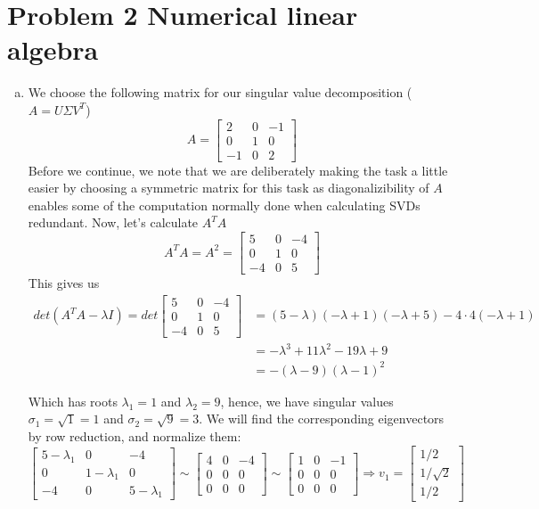 \section{Problem 2 Numerical linear algebra}
\begin{enumerate}[a)]
  \item
We choose the following matrix for our singular value decomposition ($A=U\Sigma V^T$)
\begin{equation}
  A =
  \begin{bmatrix}
    2 & 0 & -1 \\
    0 & 1 & 0 \\
    -1 & 0 & 2
  \end{bmatrix}
\end{equation}
Before we continue, we note that we are deliberately making the task a little easier by choosing a symmetric matrix for this task as diagonalizibility of $A$ enables some of the computation normally done when calculating SVDs redundant.
\newline
Now, let's calculate $A^TA$
$$
A^TA = A^2 =
\begin{bmatrix}
  5 & 0 & -4 \\
  0 & 1 & 0 \\
  -4 & 0 & 5
\end{bmatrix}
$$
This gives us
\begin{align*}
det(A^TA - \lambda I) = det
\begin{bmatrix}
  5 & 0 & -4 \\
  0 & 1 & 0 \\
  -4 & 0 & 5
\end{bmatrix}
 & = (5-\lambda)(-\lambda+1)(-\lambda+5)-4\cdot 4(-\lambda+1) \\
 & =-\lambda^3+11\lambda^2-19\lambda+9 \\
 & = -(\lambda-9)(\lambda-1)^2
\end{align*}

Which has roots $\lambda_1 = 1$ and $\lambda_2 = 9$, hence, we have singular values $\sigma_1=\sqrt{1}=1$ and $\sigma_2=\sqrt{9}=3$.
We will find the corresponding eigenvectors by row reduction, and normalize them:
$$
\begin{bmatrix}
  5-\lambda_1 & 0 & -4 \\
  0 & 1-\lambda_1 & 0 \\
  -4 & 0 & 5-\lambda_1
\end{bmatrix}
\sim
\begin{bmatrix}
  4 & 0 & -4 \\
  0 & 0 & 0 \\
  0 & 0 & 0
\end{bmatrix}
\sim
\begin{bmatrix}
  1 & 0 & -1 \\
  0 & 0 & 0 \\
  0 & 0 & 0
\end{bmatrix}
\Rightarrow v_1 =
\begin{bmatrix}
  1/2 \\
  1/\sqrt{2} \\
  1/2
\end{bmatrix}
$$


\end{enumerate}
